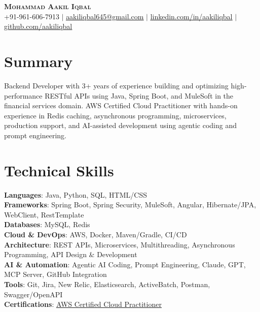 \documentclass[letterpaper,11pt]{article}
\begin{document}
\begin{center}
    \textbf{\Huge \scshape Mohammad Aakil Iqbal} \\ \vspace{2pt}
    \small +91-961-606-7913 $|$ 
    \href{mailto:aakiliqbal645@gmail.com}{\underline{aakiliqbal645@gmail.com}} $|$
    \href{https://linkedin.com/in/aakiliqbal}{\underline{linkedin.com/in/aakiliqbal}} $|$
    \href{https://github.com/aakiliqbal}{\underline{github.com/aakiliqbal}}
\end{center}

\section{Summary}
\begin{itemize}[leftmargin=0.15in, label={}]
    \small{\item{
     Backend Developer with 3+ years of experience building and optimizing high-performance RESTful APIs using Java, Spring Boot, and MuleSoft in the financial services domain. AWS Certified Cloud Practitioner with hands-on experience in Redis caching, asynchronous programming, microservices, production support, and AI-assisted development using agentic coding and prompt engineering.
    }}
\end{itemize}

\section{Technical Skills}
\begin{itemize}[leftmargin=0.15in, label={}]
    \small{\item{
     \textbf{Languages}: Java, Python, SQL, HTML/CSS \\
     \textbf{Frameworks}: Spring Boot, Spring Security, MuleSoft, Angular, Hibernate/JPA, WebClient, RestTemplate \\
     \textbf{Databases}: MySQL, Redis \\
     \textbf{Cloud \& DevOps}: AWS, Docker, Maven/Gradle, CI/CD \\
     \textbf{Architecture}: REST APIs, Microservices, Multithreading, Asynchronous Programming, API Design \& Development \\
     \textbf{AI \& Automation}: Agentic AI Coding, Prompt Engineering, Claude, GPT, MCP Server, GitHub Integration \\
     \textbf{Tools}: Git, Jira, New Relic, Elasticsearch, ActiveBatch, Postman, Swagger/OpenAPI \\
     \textbf{Certifications}: \href{https://www.credly.com/badges/242089fc-b58e-4362-b319-7de89c0a47af}{\underline{AWS Certified Cloud Practitioner}} \\
    }}
\end{itemize}
\end{document}
